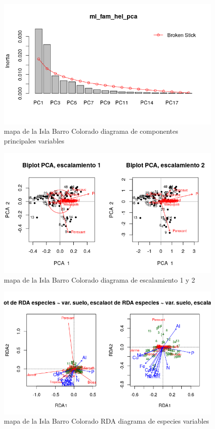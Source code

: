 \documentclass[11pt,]{article}
\begin{document}
\begin{figure}
\centering
\includegraphics[width=1.00000\textwidth]{mi_fam_hel_pca.png}
\caption{mapa de la Isla Barro Colorado diagrama de componentes
principales variables\label{fig:bci_map}}
\end{figure}

\begin{figure}
\centering
\includegraphics[width=1.00000\textwidth]{escalamiento_1_2.png}
\caption{mapa de la Isla Barro Colorado diagrama de escalamiento 1 y 2
\label{fig:bci_map}}
\end{figure}

\begin{figure}
\centering
\includegraphics[width=1.00000\textwidth]{rda_escala_especies.png}
\caption{mapa de la Isla Barro Colorado RDA diagrama de especies
variables\label{fig:bci_map}}
\end{figure}
\end{document}
